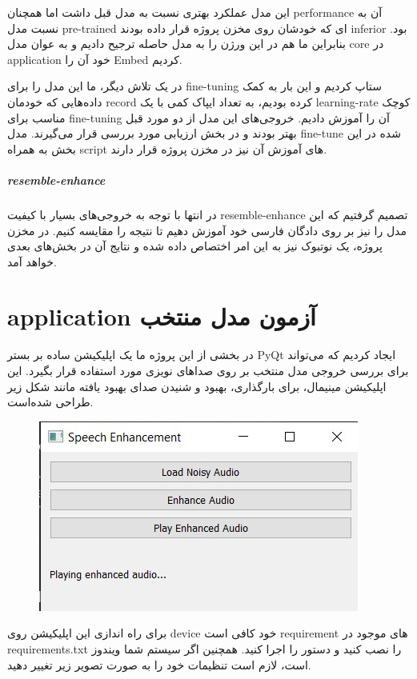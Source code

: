 \documentclass[fleqn]{report}
\begin{document}
این مدل عملکرد بهتری نسبت به مدل قبل داشت اما همچنان performance آن به نسبت مدل pre-trained ای که خودشان روی مخزن پروژه قرار داده بودند inferior بود.
بنابراین ما هم در این ورژن را به مدل حاصله ترجیح دادیم و به عوان مدل core در application خود آن را Embed کردیم.

در یک تلاش دیگر، ما این مدل را برای fine-tuning ستاپ کردیم و این بار به کمک داده‌هایی که خودمان record کرده بودیم، به تعداد ایپاک کمی با یک learning-rate کوچک مناسب برای fine-tuning آن را آموزش دادیم.
خروجی‌های این مدل از دو مورد قبل بهتر بودند و در بخش ارزیابی مورد بررسی قرار می‌گیرند.
مدل fine-tune شده در این بخش به همراه script های آموزش آن نیز در مخزن پروژه قرار دارند.


\paragraph{resemble-enhance} 
در انتها با توجه به خروجی‌های بسیار با کیفیت resemble-enhance تصمیم گرفتیم که این مدل را نیز بر روی دادگان فارسی خود آموزش دهیم تا نتیجه را مقایسه کنیم.
در مخزن پروژه، یک نوتبوک نیز به این امر اختصاص داده شده و نتایج آن در بخش‌های بعدی خواهد آمد.


\chapter{application آزمون مدل منتخب}
در بخشی از این پروژه ما یک اپلیکیشن ساده بر بستر PyQt ایجاد کردیم که می‌تواند برای بررسی خروجی مدل منتخب بر روی صدا‌های نویزی مورد استفاده قرار بگیرد.
این اپلیکیشن مینیمال، برای بارگذاری، بهبود و شنیدن صدای بهبود یافته مانند شکل زیر طراحی شده‌است.

\begin{figure}[h]

    \centering
    \includegraphics[width=.6\textwidth, keepaspectratio]{images/app.jpg}
    
    \caption{}
    \label{fig:app}
\end{figure}

برای راه اندازی این اپلیکیشن روی device خود کافی است requirement های موجود در requirements.txt را نصب کنید و دستور  را اجرا کنید.
همچنین اگر سیستم شما ویندوز است، لازم است تنظیمات خود را به صورت تصویر زیر تغییر دهید.
\end{document}

